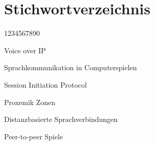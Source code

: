 %
%

\chapter{Stichwortverzeichnis} %
\begin{labeling}{1234567890}
        \item Voice over IP
        \item Sprachkommunikation in Computerspielen
        \item Session Initiation Protocol
        \item Proxemik Zonen
        \item Distanzbasierte Sprachverbindungen
        \item Peer-to-peer Spiele
\end{labeling} 


\begin{sloppypar}
	
\end{sloppypar}